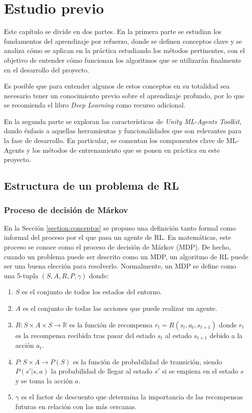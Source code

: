 \chapter{Estudio previo}\label{chapter:estudio_previo}

Este capítulo se divide en dos partes. En la primera parte se estudian los fundamentos del aprendizaje por refuerzo, donde se definen conceptos clave y se analiza cómo se aplican en la práctica estudiando los métodos pertinentes, con el objetivo de entender cómo funcionan los algoritmos que se utilizarán finalmente en el desarrollo del proyecto.

Es posible que para entender algunos de estos conceptos en su totalidad sea necesario tener un conocimiento previo sobre el aprendizaje profundo, por lo que se recomienda el libro \emph{Deep Learning} \cite{Goodfellow-et-al-2016} como recurso adicional.

En la segunda parte se exploran las características de \emph{Unity ML-Agents Toolkit}, dando énfasis a aquellas herramientas y funcionalidades que son relevantes para la fase de desarrollo. En particular, se comentan los componentes clave de ML-Agents y los métodos de entrenamiento que se ponen en práctica en este proyecto.

\section{Estructura de un problema de RL}

\subsection{Proceso de decisión de Márkov}

En la Sección \ref{section:conceptos} se propuso una definición tanto formal como informal del proceso por el que pasa un agente de RL. En matemáticas, este proceso se conoce como el proceso de decisión de Márkov (MDP). De hecho, cuando un problema puede ser descrito como un MDP, un algoritmo de RL puede ser una buena elección para resolverlo. Normalmente, un MDP se define como una 5-tupla $(S, A, R, P, \gamma)$ donde:

\begin{enumerate}
    \item[\textbullet] $S$ es el conjunto de todos los estados del entorno.
    \item[\textbullet] $A$ es el conjunto de todas las acciones que puede realizar un agente.
    \item[\textbullet] $R : S \times A \times S \rightarrow \mathbb{R}$ es la función de recompensa $r_t = R(s_t, a_t, s_{t+1})$ donde $r_t$ es la recompensa recibida tras pasar del estado $s_t$ al estado $s_{t+1}$ debido a la acción $a_t$.
    \item[\textbullet] $P : S \times A \rightarrow P(S)$ es la función de probabilidad de transición, siendo $P(s'|s, a)$ la probabilidad de llegar al estado $s'$ si se empieza en el estado $s$ y se toma la acción $a$.
    \item[\textbullet] $\gamma$ es el factor de descuento que determina la importancia de las recompensas futuras en relación con las más cercanas.
\end{enumerate}

